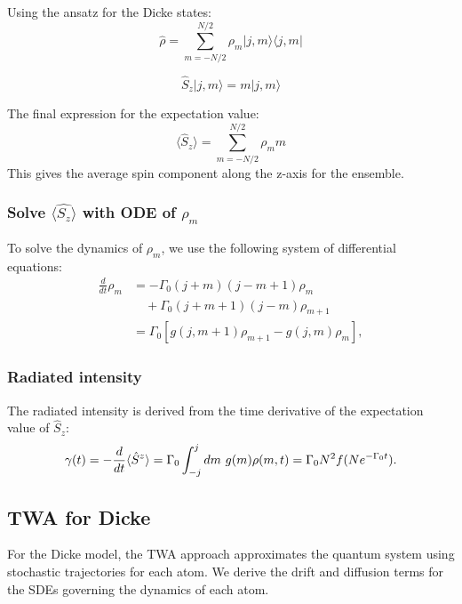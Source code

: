 \documentclass{article}
\begin{document}
    Using the ansatz for the Dicke states:
    \begin{equation}
        \hat{\rho} = \sum_{m=-N/2}^{N/2} \rho_m |j, m\rangle \langle j, m| \tag{2.29}
    \end{equation}

    \begin{equation}
        \hat{S}_z |j, m\rangle = m |j, m\rangle
    \end{equation}
    
    The final expression for the expectation value:
    \begin{equation}
        \langle \hat{S}_z \rangle = \sum_{m=-N/2}^{N/2} \rho_m m
    \end{equation}
    This gives the average spin component along the z-axis for the ensemble.

    \subsubsection{Solve $\langle \hat{S_z} \rangle$ with ODE of $\rho_m$}
    To solve the dynamics of $\rho_m$, we use the following system of differential equations:
    \begin{equation}
        \begin{aligned}
            \frac{d}{dt} \rho_m &= -\Gamma_0 (j + m)(j - m + 1)\rho_m \\ 
            &\quad + \Gamma_0 (j + m + 1)(j - m)\rho_{m+1} \\ 
            &= \Gamma_0 [g(j, m + 1)\rho_{m+1} - g(j, m)\rho_m],
        \end{aligned} \tag{2.30}
    \end{equation}
    
    \subsubsection{Radiated intensity}
    The radiated intensity is derived from the time derivative of the expectation value of $\hat{S}_z$:
    \begin{equation}
        \gamma(t) = -\frac{d}{dt}\langle\hat{S}^{z}\rangle = \Gamma_{0}\int_{-j}^{j}dm~g(m)\rho(m,t) \\
        = \Gamma_{0}N^{2}f(Ne^{-\Gamma_{0}t}).
    \end{equation}

    \subsection{TWA for Dicke}
    For the Dicke model, the TWA approach approximates the quantum system using stochastic trajectories for each atom. We derive the drift and diffusion terms for the SDEs governing the dynamics of each atom.
\end{document}
